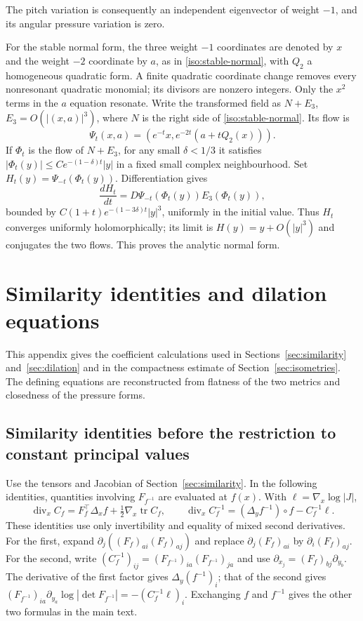 \documentclass[11pt,a4paper]{article}
\numberwithin{equation}{section}
\theoremstyle{plain}
\theoremstyle{definition}
\theoremstyle{remark}
\begin{document}
The pitch variation is consequently an independent eigenvector of
weight $-1$, and its angular pressure variation is zero.

For the stable normal form, the three weight $-1$ coordinates are denoted
by $x$ and the weight $-2$ coordinate by $a$, as in
\eqref{iso:stable-normal}, with $Q_2$ a homogeneous quadratic form.
A finite quadratic coordinate change
removes every nonresonant quadratic monomial; its divisors are nonzero
integers.  Only the $x^2$ terms in the $a$ equation resonate.  Write the
transformed field as $N+E_3$, $E_3=O(|(x,a)|^3)$, where $N$ is the right
side of \eqref{iso:stable-normal}. Its flow is
\[
 \Psi_t(x,a)=(e^{-t}x,e^{-2t}(a+tQ_2(x))).
\]
If $\Phi_t$ is the flow of $N+E_3$, for any small $\delta<1/3$ it satisfies
$|\Phi_t(y)|\le Ce^{-(1-\delta)t}|y|$ in a fixed small complex neighbourhood.
Set $H_t(y)=\Psi_{-t}(\Phi_t(y))$.  Differentiation gives
\[
 \frac{dH_t}{dt}=D\Psi_{-t}(\Phi_t(y))E_3(\Phi_t(y)),
\]
bounded by $C(1+t)e^{-(1-3\delta)t}|y|^3$, uniformly in the initial value.
Thus $H_t$ converges uniformly holomorphically; its limit is
$H(y)=y+O(|y|^3)$ and conjugates the two flows.  This proves the analytic normal form.

\section{Similarity identities and dilation equations}
\label{app:similarity-dilation}

This appendix gives the coefficient calculations used in
Sections~\ref{sec:similarity} and~\ref{sec:dilation} and in the
compactness estimate of Section~\ref{sec:isometries}.  The defining
equations are reconstructed from flatness of the two metrics and
closedness of the pressure forms. 

\subsection{Similarity identities before the restriction to constant principal values}

Use the tensors and Jacobian of Section~\ref{sec:similarity}. In the following identities, quantities involving $F_{f^{-1}}$ are
evaluated at $f(x)$. With $\ell=\nabla_x\log|J|$,
\begin{equation}\label{adil:inverse-general}
 \operatorname{div}_x C_f=F_f^{\top}\Delta_xf+
          \tfrac12\nabla_x\operatorname{tr}C_f,
 \qquad
 \operatorname{div}_x C_f^{-1}=(\Delta_y f^{-1})\circ f-C_f^{-1}\ell.
\end{equation}
These identities use only invertibility and equality of mixed second
derivatives. For the first, expand
$\partial_j((F_f)_{ai}(F_f)_{aj})$ and replace
$\partial_j(F_f)_{ai}$ by $\partial_i(F_f)_{aj}$. For the second, write
$(C_f^{-1})_{ij}=(F_{f^{-1}})_{ia}(F_{f^{-1}})_{ja}$ and use
$\partial_{x_j}=(F_f)_{bj}\partial_{y_b}$. The derivative of the first
factor gives $\Delta_y(f^{-1})_i$; that of the second gives
$(F_{f^{-1}})_{ia}\partial_{y_a}\log|\det F_{f^{-1}}|=-(C_f^{-1}\ell)_i$.
Exchanging $f$ and $f^{-1}$ gives the other two formulas in the main text.
\end{document}
